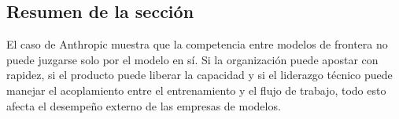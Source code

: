 \subsection{Resumen de la sección}

El caso de Anthropic muestra que la competencia entre modelos de frontera no puede juzgarse solo por el modelo en sí. Si la organización puede apostar con rapidez, si el producto puede liberar la capacidad y si el liderazgo técnico puede manejar el acoplamiento entre el entrenamiento y el flujo de trabajo, todo esto afecta el desempeño externo de las empresas de modelos.

